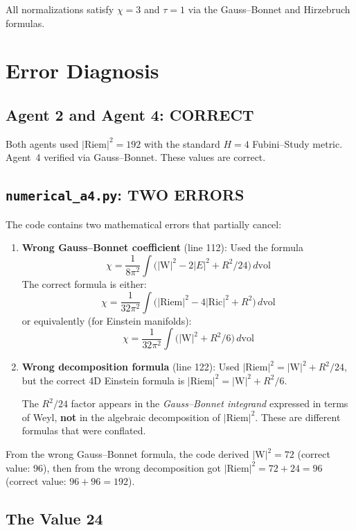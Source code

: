 \documentclass[11pt]{article}
\newcommand{\Riem}{\mathrm{Riem}}
\newcommand{\Ric}{\mathrm{Ric}}
\newcommand{\Weyl}{\mathrm{W}}
\begin{document}
All normalizations satisfy $\chi = 3$ and $\tau = 1$ via the Gauss--Bonnet
and Hirzebruch formulas.

\section{Error Diagnosis}

\subsection{Agent 2 and Agent 4: CORRECT}

Both agents used $|\Riem|^2 = 192$ with the standard $H=4$ Fubini--Study metric.
Agent~4 verified via Gauss--Bonnet. These values are correct.

\subsection{\texttt{numerical\_a4.py}: TWO ERRORS}

The code contains two mathematical errors that partially cancel:

\begin{enumerate}
  \item \textbf{Wrong Gauss--Bonnet coefficient} (line 112): Used the formula
  \[
    \chi = \frac{1}{8\pi^2}\int\bigl(|\Weyl|^2 - 2|E|^2 + R^2/24\bigr)\,d\mathrm{vol}
  \]
  The correct formula is either:
  \[
    \chi = \frac{1}{32\pi^2}\int\bigl(|\Riem|^2 - 4|\Ric|^2 + R^2\bigr)\,d\mathrm{vol}
  \]
  or equivalently (for Einstein manifolds):
  \[
    \chi = \frac{1}{32\pi^2}\int\bigl(|\Weyl|^2 + R^2/6\bigr)\,d\mathrm{vol}
  \]

  \item \textbf{Wrong decomposition formula} (line 122): Used
  $|\Riem|^2 = |\Weyl|^2 + R^2/24$, but the correct 4D Einstein formula is
  $|\Riem|^2 = |\Weyl|^2 + R^2/6$.

  The $R^2/24$ factor appears in the \emph{Gauss--Bonnet integrand} expressed
  in terms of Weyl, \textbf{not} in the algebraic decomposition of $|\Riem|^2$.
  These are different formulas that were conflated.
\end{enumerate}

From the wrong Gauss--Bonnet formula, the code derived $|\Weyl|^2 = 72$ (correct value: 96),
then from the wrong decomposition got $|\Riem|^2 = 72 + 24 = 96$ (correct value: $96 + 96 = 192$).

\subsection{The Value 24}
\end{document}
